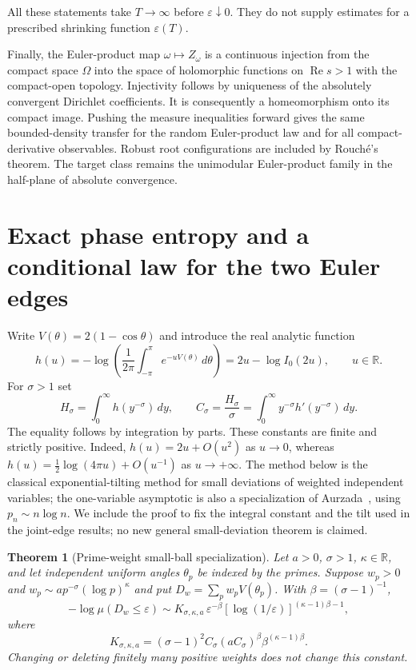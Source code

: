 \documentclass[11pt,letterpaper]{article}
\newtheorem{theorem}{Theorem}[section]
\theoremstyle{definition}
\theoremstyle{remark}
\renewcommand{\Re}{\operatorname{Re}}
\newcommand{\1}{\mathbf 1}
\begin{document}
All these statements take $T\to\infty$ before
$\varepsilon\downarrow0$.  They do not supply estimates for a
prescribed shrinking function $\varepsilon(T)$.

Finally, the Euler-product map $\omega\mapsto Z_\omega$ is a
continuous injection from the compact space $\Omega$ into the
space of holomorphic functions on $\Re s>1$ with the compact-open
topology.  Injectivity follows by uniqueness of the absolutely
convergent Dirichlet coefficients.  It is consequently a
homeomorphism onto its compact image.  Pushing the measure
inequalities forward gives the same bounded-density transfer for
the random Euler-product law and for all compact-derivative
observables.  Robust root configurations are included by
Rouch\'e's theorem.  The target class remains the unimodular
Euler-product family in the half-plane of absolute convergence.




\section{Exact phase entropy and a conditional law for the two Euler edges}
\label{p04:sec:exact-joint-edges}

Write $V(\theta)=2(1-\cos\theta)$ and introduce the real analytic function
\[
 h(u)=-\log\left(\frac1{2\pi}\int_{-\pi}^{\pi}
                  e^{-uV(\theta)}\,d\theta\right)
     =2u-\log I_0(2u),\qquad u\in\mathbb R.
\]
For $\sigma>1$ set
\begin{equation}\label{p04:eq:entropy-Csigma}
 H_\sigma=\int_0^\infty h(y^{-\sigma})\,dy,
 \qquad C_\sigma=\frac{H_\sigma}{\sigma}
 =\int_0^\infty y^{-\sigma}h'(y^{-\sigma})\,dy.
\end{equation}
The equality follows by integration by parts. These constants are
finite and strictly positive. Indeed, $h(u)=2u+O(u^2)$ as $u\to0$,
whereas $h(u)=\frac12\log(4\pi u)+O(u^{-1})$ as $u\to+\infty$.
The method below is the classical exponential-tilting method for
small deviations of weighted independent variables; the one-variable
asymptotic is also a specialization of Aurzada~\cite{Aurzada},
using $p_n\sim n\log n$. We include the proof
to fix the integral constant and the tilt used in the joint-edge
results; no new general small-deviation theorem is claimed.

\begin{theorem}[Prime-weight small-ball specialization]
\label{p04:thm:exact-phase-entropy}
Let $a>0$, $\sigma>1$, $\kappa\in\mathbb R$, and let independent
uniform angles $\theta_p$ be indexed by the primes. Suppose $w_p>0$ and
$w_p\sim a p^{-\sigma}(\log p)^\kappa$ and put
$D_w=\sum_p w_pV(\theta_p)$. With $\beta=(\sigma-1)^{-1}$,
\begin{equation}\label{p04:eq:exact-general-entropy}
 -\log\mu(D_w\le\varepsilon)
 \sim K_{\sigma,\kappa,a}\,
 \varepsilon^{-\beta}
 [\log(1/\varepsilon)]^{(\kappa-1)\beta-1},
\end{equation}
where
\[
 K_{\sigma,\kappa,a}
   =(\sigma-1)^2 C_\sigma
     (aC_\sigma)^\beta\beta^{(\kappa-1)\beta}.
\]
Changing or deleting finitely many positive weights does not change
this constant.
\end{theorem}
\end{document}
